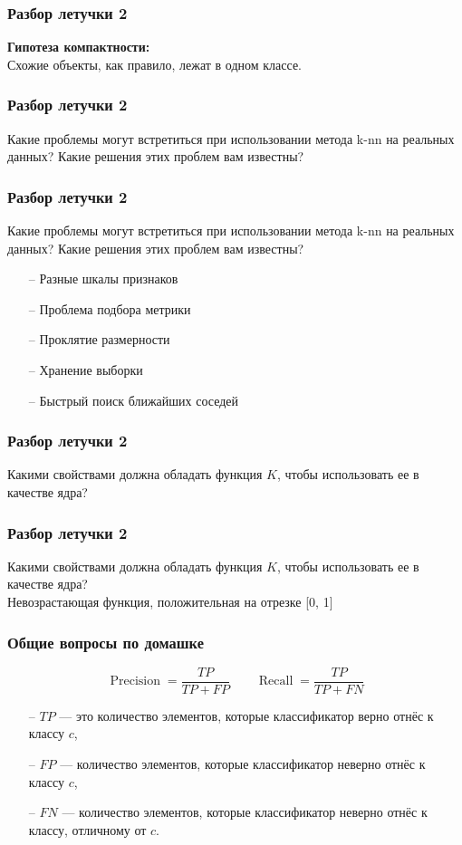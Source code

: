 \documentclass[12pt]{beamer}
\begin{document}
\begin{frame}\frametitle{Разбор летучки 2}
\textbf{Гипотеза компактности:}\\
Схожие объекты, как правило, лежат в одном классе.\\
\end{frame}

\begin{frame}\frametitle{Разбор летучки 2}
Какие проблемы могут встретиться при использовании метода k-nn на реальных
данных? Какие решения этих проблем вам известны?
\end{frame}

\begin{frame}\frametitle{Разбор летучки 2}
Какие проблемы могут встретиться при использовании метода k-nn на реальных
данных? Какие решения этих проблем вам известны?\\
\vspace{5mm}
\begin{itemize}
\item[--] Разные шкалы признаков
\item[--] Проблема подбора метрики
\item[--] Проклятие размерности
\item[--] Хранение выборки
\item[--] Быстрый поиск ближайших соседей
\end{itemize}
\end{frame}


\begin{frame}\frametitle{Разбор летучки 2}
Какими свойствами должна обладать функция $K$, чтобы использовать ее в качестве ядра?
\end{frame}

\begin{frame}\frametitle{Разбор летучки 2}
Какими свойствами должна обладать функция $K$, чтобы использовать ее в качестве ядра?\\
\vspace{5mm}
Невозрастающая функция, положительная на отрезке [0, 1]
\end{frame}


\begin{frame}\frametitle{Общие вопросы по домашке}

$$\operatorname{Precision} = \frac{TP}{TP + FP}
\qquad
\operatorname{Recall} = \frac{TP}{TP + FN}$$
\begin{itemize}
\item[--] $TP$ --- это количество элементов, которые классификатор верно отнёс к классу $c$,
\item[--] $FP$ --- количество элементов, которые классификатор неверно отнёс к классу $c$,
\item[--] $FN$ --- количество элементов, которые классификатор неверно отнёс к классу, отличному от $c$.
\end{itemize}
\end{frame}
\end{document}
